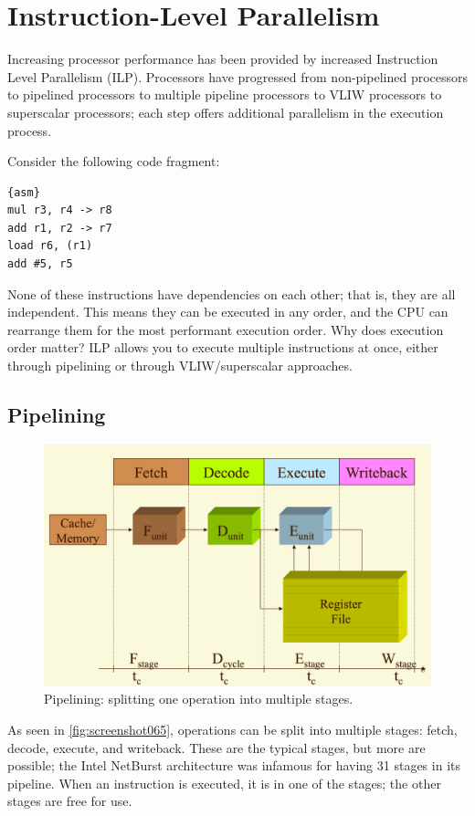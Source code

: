 \chapter{Instruction-Level Parallelism}
\label{chap:ilp}
Increasing processor performance has been provided by increased Instruction Level Parallelism (ILP). Processors have progressed from non-pipelined processors to pipelined processors to multiple pipeline processors to VLIW processors to superscalar processors; each step offers additional parallelism in the execution process.

Consider the following code fragment:
\begin{lstlisting}{asm}
mul r3, r4 -> r8
add r1, r2 -> r7
load r6, (r1)
add #5, r5
\end{lstlisting}

None of these instructions have dependencies on each other; that is, they are all independent. This means they can be executed in any order, and the CPU can rearrange them for the most performant execution order. Why does execution order matter? ILP allows you to execute multiple instructions at once, either through pipelining or through VLIW/superscalar approaches.

\section{Pipelining}
\begin{figure}
\centering
\includegraphics[width=0.7\linewidth]{figures/screenshot065}
\caption{Pipelining: splitting one operation into multiple stages.}
\label{fig:screenshot065}
\end{figure}

As seen in \autoref{fig:screenshot065}, operations can be split into multiple stages: fetch, decode, execute, and writeback. These are the typical stages, but more are possible; the Intel NetBurst architecture was infamous for having 31 stages in its pipeline. When an instruction is executed, it is in one of the stages; the other stages are free for use. 

